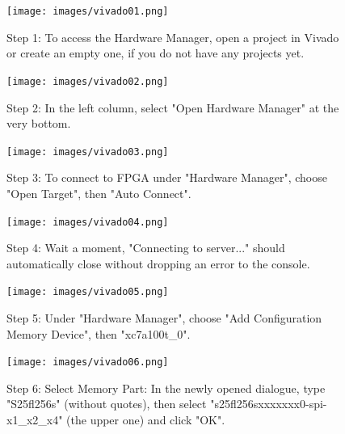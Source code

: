 \newpage


\begin{figure}[H]
\centering
  \texttt{[image: images/vivado01.png]}
  \captionsetup{width=0.8\linewidth}
  \caption{Step 1: To access the Hardware Manager, open a project in
           Vivado or create an empty one, if you do not have any projects yet.}
  \label{fig:vivado01}

\vspace{5mm}

\centering
  \texttt{[image: images/vivado02.png]}
  \captionsetup{width=0.8\linewidth}
  \caption{Step 2: In the left column, select "Open Hardware Manager"
           at the very bottom.}
  \label{fig:vivado02}
\end{figure}


\begin{figure}[H]
  \centering
  \texttt{[image: images/vivado03.png]}
  \captionsetup{width=0.8\linewidth}
  \caption{Step 3: To connect to FPGA
           under "Hardware Manager", choose "Open Target", then "Auto Connect".}
  \label{fig:vivado03}

\vspace{5mm}

  \texttt{[image: images/vivado04.png]}
  \captionsetup{width=0.8\linewidth}
  \caption{Step 4: Wait a moment, "Connecting to server..."  should
           automatically close without dropping an error to the console.}
  \label{fig:vivado04}
\end{figure}


\begin{figure}[H]
  \centering
  \texttt{[image: images/vivado05.png]}
  \captionsetup{width=0.8\linewidth}
  \caption{Step 5: Under "Hardware Manager", choose "Add Configuration
           Memory Device", then "xc7a100t\_0".}
  \label{fig:vivado05}

\vspace{5mm}

  \texttt{[image: images/vivado06.png]}
  \captionsetup{width=0.8\linewidth}
  \caption{Step 6: Select Memory Part:
           In the newly opened dialogue, type "S25fl256s"
           (without quotes), then select "s25fl256sxxxxxxx0-spi-x1\_x2\_x4"
           (the upper one) and click "OK".}
  \label{fig:vivado06}
\end{figure}


